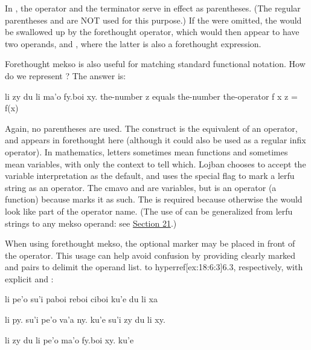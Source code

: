  In , the operator  and
    the terminator  serve in effect as parentheses. (The regular
    parentheses  and  are NOT used for this purpose.) If
    the  were omitted, the  would be swallowed up by
    the  forethought operator, which would then appear to have
    two operands,  and , where the latter is also a
    forethought expression.

Forethought mekso is also useful for matching standard
    functional notation. How do we represent ? The
    answer is:
\begin{example}
li zy du li ma'o fy.boi xy.\n
the-number z equals the-number the-operator f x\n
z = f(x)
\end{example}

Again, no parentheses are used. The construct 
    is the equivalent of an operator, and appears in forethought
    here (although it could also be used as a regular infix
    operator). In mathematics, letters sometimes mean functions and
    sometimes mean variables, with only the context to tell which.
    Lojban chooses to accept the variable interpretation as the
    default, and uses the special flag  to mark a lerfu
    string as an operator. The cmavo  and  are
    variables, but  is an operator (a function) because
     marks it as such. The  is required because
    otherwise the  would look like part of the operator
    name. (The use of  can be generalized from lerfu
    strings to any mekso operand: see \hyperref[sec:18:21]{Section
    21}.) 

When using forethought mekso, the optional marker 
    may be placed in front of the operator. This usage can help
    avoid confusion by providing clearly marked  and
     pairs to delimit the operand list.  to hyperref[ex:18:6:3]{6.3},
    respectively, with explicit  and :
\begin{example}
li pe'o su'i paboi reboi ciboi ku'e du li xa
\end{example}

\begin{example}
li py. su'i pe'o va'a ny. ku'e su'i zy du li xy.
\end{example}

\begin{example}
li zy du li pe'o ma'o fy.boi xy. ku'e
\end{example}

